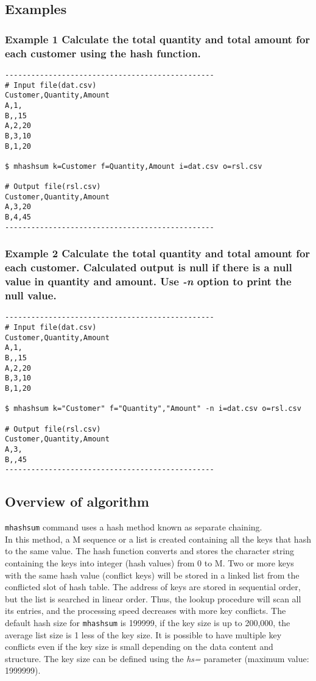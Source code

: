 \documentclass[a4paper]{jarticle}
\begin{document}
\subsection*{Examples}
\subsubsection*{Example 1 Calculate the total quantity and total amount for each customer using the hash function.}

\begin{verbatim}
------------------------------------------------
# Input file(dat.csv)
Customer,Quantity,Amount
A,1,
B,,15
A,2,20
B,3,10
B,1,20

$ mhashsum k=Customer f=Quantity,Amount i=dat.csv o=rsl.csv

# Output file(rsl.csv)
Customer,Quantity,Amount
A,3,20
B,4,45
------------------------------------------------
\end{verbatim}

\subsubsection*{Example 2 Calculate the total quantity and total amount for each customer. Calculated output is null if there is a null value in quantity and amount. Use \emph{-n} option to print the null value. \\}

\begin{verbatim}
------------------------------------------------
# Input file(dat.csv)
Customer,Quantity,Amount
A,1,
B,,15
A,2,20
B,3,10
B,1,20

$ mhashsum k="Customer" f="Quantity","Amount" -n i=dat.csv o=rsl.csv

# Output file(rsl.csv)
Customer,Quantity,Amount
A,3,
B,,45
------------------------------------------------
\end{verbatim}

\subsection*{Overview of algorithm}
\verb|mhashsum| command uses a hash method known as separate chaining. \\
In this method, a M sequence or a list is created containing all the keys that hash to the same value. The hash function converts and stores the character string containing the keys into integer  (hash values) from 0 to M. Two or more keys with the same hash value (conflict keys) will be stored in a linked list from the conflicted slot of hash table.  The address of keys are stored in sequential order, but the list is searched in linear order. Thus, the lookup procedure will scan all its entries, and the processing speed decreases with more key conflicts. 
The default hash size for \verb|mhashsum| is 199999, if the key size is up to 200,000, the average list size is 1 less of the key size. It is possible to have multiple key conflicts even if the key size is small depending on the data content and structure. The key size can be defined using the \emph{hs=} parameter (maximum value: 1999999). 
\end{document}

